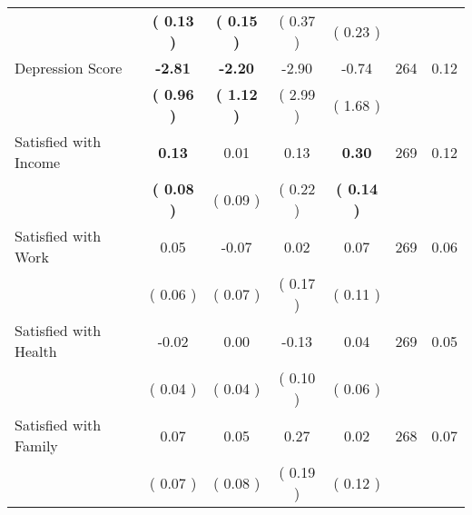 \begin{tabular}{lcccccc}
 & \textbf{(     0.13 )} & \textbf{(     0.15 )} & (     0.37 ) & (     0.23 ) & \\
Depression Score & \textbf{    -2.81} & \textbf{    -2.20} &     -2.90 &     -0.74 & 264 &      0.12 \\ 
 & \textbf{(     0.96 )} & \textbf{(     1.12 )} & (     2.99 ) & (     1.68 ) & \\
Satisfied with Income & \textbf{     0.13} &      0.01 &      0.13 & \textbf{     0.30} & 269 &      0.12 \\ 
 & \textbf{(     0.08 )} & (     0.09 ) & (     0.22 ) & \textbf{(     0.14 )} & \\
Satisfied with Work &      0.05 &     -0.07 &      0.02 &      0.07 & 269 &      0.06 \\ 
 & (     0.06 ) & (     0.07 ) & (     0.17 ) & (     0.11 ) & \\
Satisfied with Health &     -0.02 &      0.00 &     -0.13 &      0.04 & 269 &      0.05 \\ 
 & (     0.04 ) & (     0.04 ) & (     0.10 ) & (     0.06 ) & \\
Satisfied with Family &      0.07 &      0.05 &      0.27 &      0.02 & 268 &      0.07 \\ 
 & (     0.07 ) & (     0.08 ) & (     0.19 ) & (     0.12 ) & \\
\bottomrule
\end{tabular}
